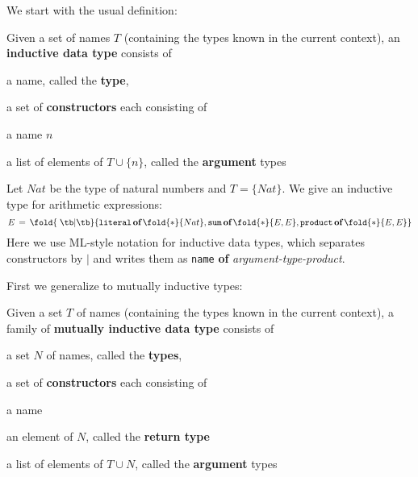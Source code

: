 We start with the usual definition:

\begin{definition}\label{def:idt}
Given a set of names $T$ (containing the types known in the current context), an \textbf{inductive data type} consists of
\begin{compactitem}
 \item a name, called the \textbf{type},
 \item a set of \textbf{constructors} each consisting of
 \begin{compactitem}
  \item a name $n$
  \item a list of elements of $T\cup\{n\}$, called the \textbf{argument} types
 \end{compactitem} 
\end{compactitem}
\end{definition}

\newcommand{\cons}[2]{\mathtt{#1}\,\kw{of}\,\fold{*}{#2}}
\newcommand{\indtype}[2]{#1\,=\,\fold{\;\tb|\tb}{#2}}
\newcommand{\consnot}[3]{\mathtt{#1}\,\kw{of}\,\fold{*}{#2}\,\#\,#3}
\newcommand{\consn}[2]{\mathtt{#1}\,\#\,#2}

\begin{example}
Let $Nat$ be the type of natural numbers and $T=\{Nat\}$.
We give an inductive type for arithmetic expressions:
\[
\indtype{E}{\cons{literal}{Nat}, \cons{sum}{E,E}, \cons{product}{E,E}} \\
\]
	Here we use ML-style notation for inductive data types, which separates constructors by $|$ and writes them as \texttt{name} \textbf{of} \emph{argument-type-product}.
\end{example}

First we generalize to mutually inductive types:

\begin{definition}
Given a set $T$ of names (containing the types known in the current context), a family of \textbf{mutually inductive data type} consists of
\begin{compactitem}
 \item a set $N$ of names, called the \textbf{types},
 \item a set of \textbf{constructors} each consisting of
 \begin{compactitem}
  \item a name
  \item an element of $N$, called the \textbf{return type}
  \item a list of elements of $T\cup N$, called the \textbf{argument} types
 \end{compactitem} 
\end{compactitem}
\end{definition}

